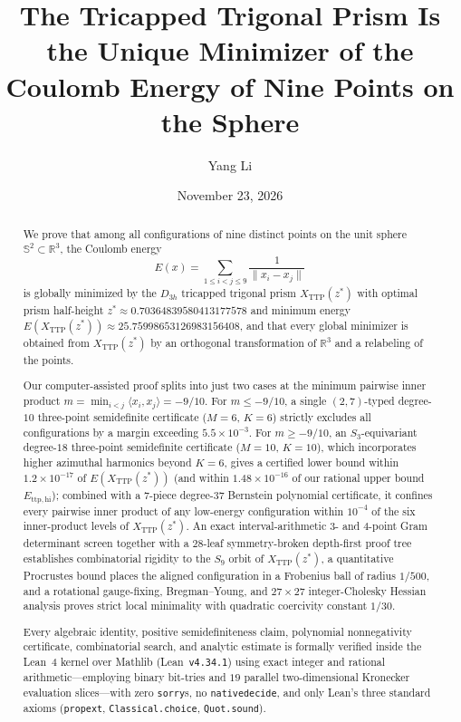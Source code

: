 \documentclass[11pt,reqno]{amsart}
\title[The Thomson Problem for Nine Points on the Sphere]{%
The Tricapped Trigonal Prism Is the Unique Minimizer of the Coulomb Energy of Nine Points on the Sphere}
\author{Yang Li}
\date{November 23, 2026}
\renewcommand{\_}{\origunderscore\allowbreak}
\theoremstyle{definition}
\newcommand{\R}{\mathbb{R}}
\newcommand{\Sph}{\mathbb{S}^2}
\newcommand{\ip}[2]{\langle #1, #2 \rangle}
\newcommand{\norm}[1]{\lVert #1 \rVert}
\newcommand{\TTP}{X_{\mathrm{TTP}}}
\newcommand{\Ettphi}{E_{\mathrm{ttp,hi}}}
\begin{document}
\begin{abstract}
We prove that among all configurations of nine distinct points on the unit sphere $\Sph \subset \R^3$, the Coulomb energy
\[
  E(x) = \sum_{1 \le i < j \le 9} \frac{1}{\norm{x_i - x_j}}
\]
is globally minimized by the $D_{3h}$ tricapped trigonal prism $\TTP(z^*)$ with optimal prism half-height $z^* \approx 0.70364839580413177578$ and minimum energy $E(\TTP(z^*)) \approx 25.75998653126983156408$, and that every global minimizer is obtained from $\TTP(z^*)$ by an orthogonal transformation of $\R^3$ and a relabeling of the points.

Our computer-assisted proof splits into just two cases at the minimum pairwise inner product $m = \min_{i<j}\ip{x_i}{x_j} = -9/10$.
For $m \le -9/10$, a single $(2,7)$-typed degree-$10$ three-point semidefinite certificate ($M=6$, $K=6$) strictly excludes all configurations by a margin exceeding $5.5 \times 10^{-3}$.
For $m \ge -9/10$, an $S_3$-equivariant degree-$18$ three-point semidefinite certificate ($M=10$, $K=10$), which incorporates higher azimuthal harmonics beyond $K = 6$, gives a certified lower bound within $1.2 \times 10^{-17}$ of $E(\TTP(z^*))$ (and within $1.48 \times 10^{-16}$ of our rational upper bound $\Ettphi$); combined with a $7$-piece degree-$37$ Bernstein polynomial certificate, it confines every pairwise inner product of any low-energy configuration within $10^{-4}$ of the six inner-product levels of $\TTP(z^*)$.
An exact interval-arithmetic $3$- and $4$-point Gram determinant screen together with a $28$-leaf symmetry-broken depth-first proof tree establishes combinatorial rigidity to the $S_9$ orbit of $\TTP(z^*)$, a quantitative Procrustes bound places the aligned configuration in a Frobenius ball of radius $1/500$, and a rotational gauge-fixing, Bregman--Young, and $27\times 27$ integer-Cholesky Hessian analysis proves strict local minimality with quadratic coercivity constant $1/30$.

Every algebraic identity, positive semidefiniteness claim, polynomial nonnegativity certificate, combinatorial search, and analytic estimate is formally verified inside the Lean~4 kernel over Mathlib (Lean~\texttt{v4.34.1}) using exact integer and rational arithmetic---employing binary bit-tries and $19$ parallel two-dimensional Kronecker evaluation slices---with zero \texttt{sorry}s, no \texttt{native\_decide}, and only Lean's three standard axioms (\texttt{propext}, \texttt{Classical.choice}, \texttt{Quot.sound}).
\end{abstract}
\end{document}
